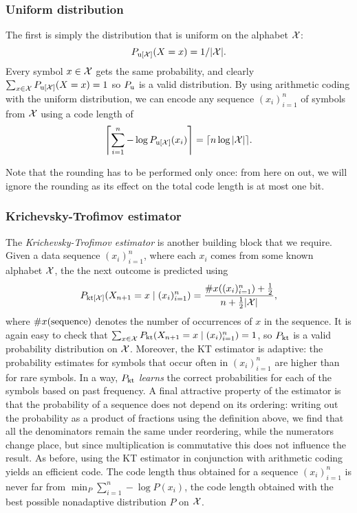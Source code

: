 \subsubsection{Uniform distribution}
The first is simply the distribution that is uniform on the alphabet ${\mathcal X}$:
\[P_{\textnormal{u}[{\mathcal X}]}(X=x) = 1/|{\mathcal X}|.\] Every symbol $x\in{\mathcal X}$ gets the same
probability, and clearly $\sum_{x\in{\mathcal X}}P_{\textnormal{u}[{\mathcal X}]}(X=x)=1$ so
$P_\textnormal{u}$ is a valid distribution. By using arithmetic coding with
the uniform distribution, we can encode any sequence $(x_i)_{i=1}^n$
of symbols from ${\mathcal X}$ using a code length of
\[\left\lceil\sum_{i=1}^n -\log P_{\textnormal{u}[{\mathcal X}]}(x_i)\right\rceil=\lceil
n\log|{\mathcal X}|\rceil.\]

Note that the rounding has to be performed only once: from here on
out, we will ignore the rounding as its effect on the total code
length is at most one bit.

\subsubsection{Krichevsky-Trofimov estimator} The
\emph{Krichevsky-Trofimov estimator} \cite{krichevsky1981} is another building
block that we require.  Given a data sequence $(x_i)_{i=1}^n$, where
each $x_i$ comes from some known alphabet ${\mathcal X}$, the the next outcome
is predicted using
\[
P_{\textnormal{kt}[{\mathcal X}]}(X_{n+1}=x\mid (x_i)_{i=1}^n)=\frac{\#x((x_i)_{i=1}^n)+\tfrac{1}{2}}{n+\tfrac{1}{2}|{\mathcal X}|},
\]
where $\#x(\textnormal{sequence})$ denotes the number of occurrences of $x$ in
the sequence. It is again easy to check that
$\sum_{x\in{\mathcal X}}P_\textnormal{kt}(X_{n+1}=x\mid(x_i)_{i=1}^n)=1$, so $P_\textnormal{kt}$
is a valid probability distribution on ${\mathcal X}$. Moreover, the KT
estimator is adaptive: the probability estimates for symbols that
occur often in $(x_i)_{i=1}^n$ are higher than for rare symbols. In a
way, $P_\textnormal{kt}$ \emph{learns} the correct probabilities for each of
the symbols based on past frequency. A final attractive property of
the estimator is that the probability of a sequence does not depend on
its ordering: writing out the probability as a product of fractions
using the definition above, we find that all the denominators remain
the same under reordering, while the numerators change place, but
since multiplication is commutative this does not influence the
result. As before, using the KT estimator in conjunction with
arithmetic coding yields an efficient code. The code length thus
obtained for a sequence $(x_i)_{i=1}^n$ is never far from $\min_P
\sum_{i=1}^n -\log P(x_i)$, the code length obtained with the best
possible nonadaptive distribution $P$ on ${\mathcal X}$.

